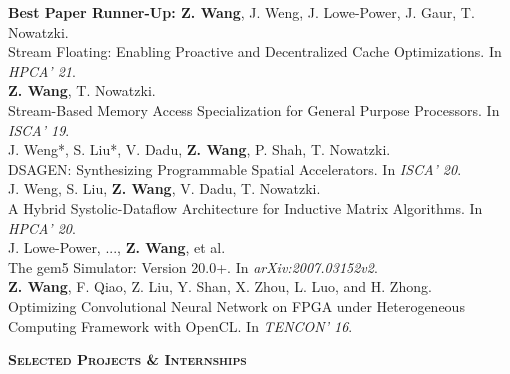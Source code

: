 \documentclass[a4paper]{article}
\newenvironment{changemargin}[2]{%
  \begin{list}{}{%
    \setlength{\topsep}{0pt}%
    \setlength{\leftmargin}{#1}%
    \setlength{\rightmargin}{#2}%
    \setlength{\listparindent}{\parindent}%
    \setlength{\itemindent}{\parindent}%
    \setlength{\parsep}{\parskip}%
  }%
  \item[]}{\end{list}
}
\newcommand{\lineover}{
	\begin{changemargin}{-0.05in}{-0.05in}
		\vspace*{-8pt}
		\hrulefill \\
		\vspace*{-2pt}
	\end{changemargin}
}
\newcommand{\header}[1]{
	\begin{changemargin}{-0.5in}{-0.5in}
		\scshape{\textbf{#1}}\\
  	\lineover
	\end{changemargin}
}
\newenvironment{body} {
	\vspace*{-16pt}
	\begin{changemargin}{-0.25in}{-0.5in}
  }	
	{\end{changemargin}
}
\begin{document}
\begin{body}
	\vspace{14pt}
	\textbf{Best Paper Runner-Up: Z. Wang}, J. Weng, J. Lowe-Power, J. Gaur, T. Nowatzki. \\
	Stream Floating: Enabling Proactive and Decentralized Cache Optimizations. In \emph{HPCA' 21}.\\
	\smallskip
	\textbf{Z. Wang}, T. Nowatzki. \\
	Stream-Based Memory Access Specialization for General Purpose Processors. In \emph{ISCA' 19}.\\
	\smallskip
	J. Weng*, S. Liu*, V. Dadu, \textbf{Z. Wang}, P. Shah, T. Nowatzki. \\
	DSAGEN: Synthesizing Programmable Spatial Accelerators. In \emph{ISCA' 20}.\\
	\smallskip
	J. Weng, S. Liu, \textbf{Z. Wang}, V. Dadu, T. Nowatzki. \\
	A Hybrid Systolic-Dataflow Architecture for Inductive Matrix Algorithms. In \emph{HPCA' 20}.\\
	\smallskip
	J. Lowe-Power, ..., \textbf{Z. Wang}, et al. \\
	The gem5 Simulator: Version 20.0+. In \emph{arXiv:2007.03152v2}.\\
	\smallskip
	\textbf{Z. Wang}, F. Qiao, Z. Liu, Y. Shan, X. Zhou, L. Luo, and H. Zhong. \\
	Optimizing Convolutional Neural Network on FPGA under Heterogeneous Computing Framework with OpenCL. In \emph{TENCON' 16}.\\
\end{body}

\smallskip
\smallskip

\header{Selected Projects \& Internships}
\end{document}
